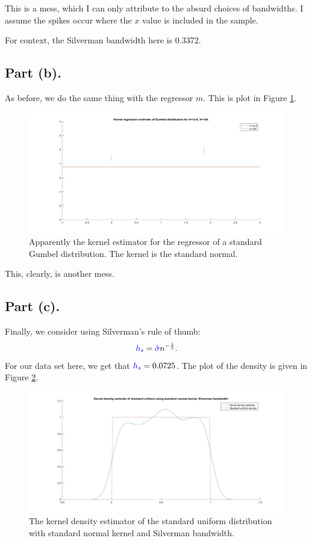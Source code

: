 \documentclass{article}
\renewcommand{\r}[1]{\textcolor{blue}{#1}}
\begin{document}
This is a mess, which I can only attribute to the absurd choices of bandwidths. I assume the spikes occur where the $x$ value is included in the sample.

For context, the Silverman bandwidth here is 0.3372.

\subsection{Part (b).}
As before, we do the same thing with the regressor $m$. This is plot in Figure \ref{fig:q3m}.

\begin{center}
\begin{figure}
\centering
\includegraphics[width=13cm]{q3regression.jpg}
\caption{Apparently the kernel estimator for the regressor of a standard Gumbel distribution. The kernel is the standard normal.}
\label{fig:q3m}
\end{figure} 
\end{center}

This, clearly, is another mess.

\subsection{Part (c).}
Finally, we consider using Silverman's rule of thumb:
\begin{equation} \r{h_{s}} = \r{\hat{\sigma}}n^{-\frac{1}{5}}.\end{equation}
For our data set here, we get that $\r{h_{s}}=0.0725$. The plot of the density is given in Figure \ref{fig:q3u}. 

\begin{center}
\begin{figure}
\centering
\includegraphics[width=13cm]{q3uniform.jpg}
\caption{The kernel density estimator of the standard uniform distribution with standard normal kernel and Silverman bandwidth.}
\label{fig:q3u}
\end{figure} 
\end{center}
\end{document}
